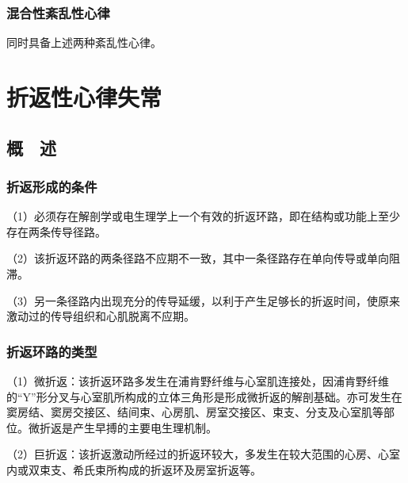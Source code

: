 \protect\hypertarget{text00020.htmlux5cux23subid223}{}{}

\subsection{混合性紊乱性心律}

同时具备上述两种紊乱性心律。

\protect\hypertarget{text00021.html}{}{}

\protect\hypertarget{text00021.htmlux5cux23chapter21}{}{}

\chapter{折返性心律失常}

\protect\hypertarget{text00021.htmlux5cux23subid224}{}{}

\section{概　述}

\protect\hypertarget{text00021.htmlux5cux23subid225}{}{}

\subsection{折返形成的条件}

（1）必须存在解剖学或电生理学上一个有效的折返环路，即在结构或功能上至少存在两条传导径路。

（2）该折返环路的两条径路不应期不一致，其中一条径路存在单向传导或单向阻滞。

（3）另一条径路内出现充分的传导延缓，以利于产生足够长的折返时间，使原来激动过的传导组织和心肌脱离不应期。

\protect\hypertarget{text00021.htmlux5cux23subid226}{}{}

\subsection{折返环路的类型}

（1）微折返：该折返环路多发生在浦肯野纤维与心室肌连接处，因浦肯野纤维的“Y”形分叉与心室肌所构成的立体三角形是形成微折返的解剖基础。亦可发生在窦房结、窦房交接区、结间束、心房肌、房室交接区、束支、分支及心室肌等部位。微折返是产生早搏的主要电生理机制。

（2）巨折返：该折返激动所经过的折返环较大，多发生在较大范围的心房、心室内或双束支、希氏束所构成的折返环及房室折返等。

